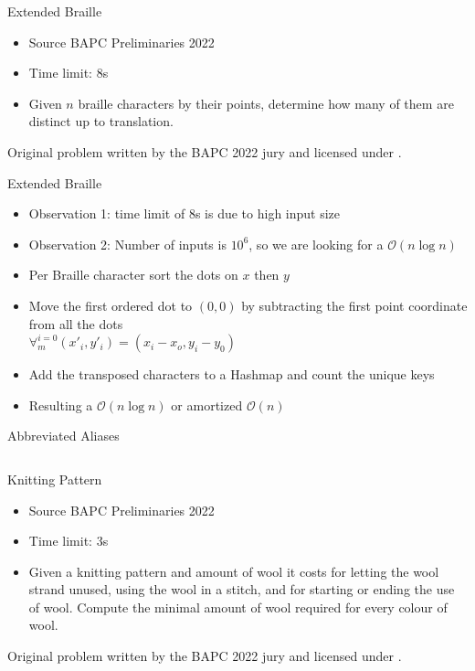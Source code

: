 \documentclass[11pt,pdf, aspectratio=169]{beamer}
\begin{document}
  \begin{frame}{Extended Braille}
    \begin{itemize}
      \item Source BAPC Preliminaries 2022
      \item Time limit: 8s
      \item Given $n$ braille characters by their points, determine how many of them are distinct up to translation.
    \end{itemize}
    Original problem written by the BAPC 2022 jury and licensed under \doclicenseLongNameRef.

    \doclicenseImage

  \end{frame}
  \begin{frame}{Extended Braille}
    \begin{itemize}
      \item Observation 1: time limit of 8s is due to high input size
      \item Observation 2: Number of inputs is $10^6$, so we are looking for a $\mathcal{O}(n\log{}n)$
      \item Per Braille character sort the dots on $x$ then $y$
      \item Move the first ordered dot to $(0, 0)$ by subtracting the first point coordinate from all the dots\\
      $\forall^{i=0}_m (x'_i, y'_i) = (x_i - x_o, y_i - y_0)$
      \item Add the transposed characters to a Hashmap and count the unique keys
      \item Resulting a $\mathcal{O}(n\log{}n)$ or amortized $\mathcal{O}(n)$
    \end{itemize}
  \end{frame}
  \begin{frame}[containsverbatim]{Abbreviated Aliases}
    \inputminted{python}{code/session-1/python/dapc-e.py}
  \end{frame}
  \begin{frame}{Knitting Pattern}
    \begin{itemize}
      \item Source BAPC Preliminaries 2022
      \item Time limit: 3s
      \item Given a knitting pattern and amount of wool it costs for letting the wool strand unused, using the wool in a stitch, and for starting or ending the use of wool.
      Compute the minimal amount of wool required for every colour of wool.
    \end{itemize}
    Original problem written by the BAPC 2022 jury and licensed under \doclicenseLongNameRef.

    \doclicenseImage
  \end{frame}
\end{document}
